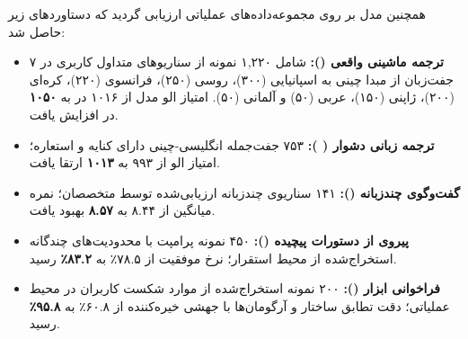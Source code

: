 \begin{table}[htbp]
\centering
\caption{ارزیابی عملکرد مدل در بخش‌های فرانت‌اند، بک‌اند و افق طولانی بنچمارک }
\label{tab:glm5_ccbench_eval}
\end{table}

همچنین مدل  بر روی مجموعه‌داده‌های عملیاتی ارزیابی گردید که دستاوردهای زیر حاصل شد:
\begin{itemize}
    \item \textbf{ترجمه ماشینی واقعی ():} شامل ۱,۲۲۰ نمونه از سناریوهای متداول کاربری در ۷ جفت‌زبان از مبدا چینی به اسپانیایی (۳۰۰)، روسی (۲۵۰)، فرانسوی (۲۲۰)، کره‌ای (۲۰۰)، ژاپنی (۱۵۰)، عربی (۵۰) و آلمانی (۵۰). امتیاز الو مدل از ۱۰۱۶ در  به \textbf{۱۰۵۰} در  افزایش یافت.
    \item \textbf{ترجمه زبانی دشوار ( \cite{tian2026beyond}):} ۷۵۳ جفت‌جمله انگلیسی-چینی دارای کنایه و استعاره؛ امتیاز الو از ۹۹۳ به \textbf{۱۰۱۳} ارتقا یافت.
    \item \textbf{گفت‌وگوی چندزبانه ():} ۱۴۱ سناریوی چندزبانه ارزیابی‌شده توسط متخصصان؛ نمره میانگین از ۸.۴۴ به \textbf{۸.۵۷} بهبود یافت.
    \item \textbf{پیروی از دستورات پیچیده ():} ۴۵۰ نمونه پرامپت با محدودیت‌های چندگانه استخراج‌شده از محیط استقرار؛ نرخ موفقیت از ۷۸.۵٪ به \textbf{۸۳.۲٪} رسید.
    \item \textbf{فراخوانی ابزار ():} ۲۰۰ نمونه استخراج‌شده از موارد شکست کاربران در محیط عملیاتی؛ دقت تطابق ساختار و آرگومان‌ها با جهشی خیره‌کننده از ۶۰.۸٪ به \textbf{۹۵.۸٪} رسید.
\end{itemize}